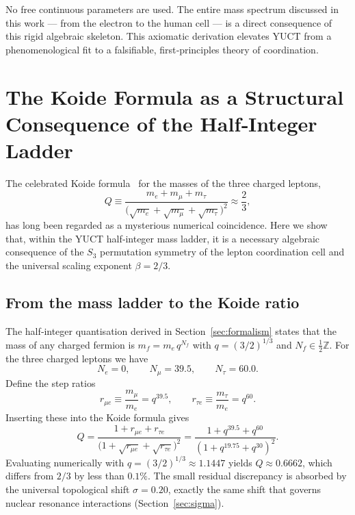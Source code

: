 \documentclass[11pt,a4paper]{article}
\begin{document}
No free continuous parameters are used. The entire mass spectrum discussed in this work — from the electron to the human cell — is a direct consequence of this rigid algebraic skeleton. This axiomatic derivation elevates YUCT from a phenomenological fit to a falsifiable, first‑principles theory of coordination.

\section{The Koide Formula as a Structural Consequence of the Half‑Integer Ladder}
\label{sec:koide}

The celebrated Koide formula~\cite{Koide1983} for the masses of the three
charged leptons,
\begin{equation}
	Q \equiv \frac{m_e + m_\mu + m_\tau}{\bigl(\sqrt{m_e} + \sqrt{m_\mu} + \sqrt{m_\tau}\bigr)^2}
	\approx \frac{2}{3},
\end{equation}
has long been regarded as a mysterious numerical coincidence.  Here we show
that, within the YUCT half‑integer mass ladder, it is a necessary algebraic
consequence of the $S_3$ permutation symmetry of the lepton coordination
cell and the universal scaling exponent $\beta = 2/3$.

\subsection{From the mass ladder to the Koide ratio}

The half‑integer quantisation derived in Section~\ref{sec:formalism} states
that the mass of any charged fermion is $m_f = m_e \, q^{N_f}$ with
$q = (3/2)^{1/3}$ and $N_f \in \frac12\mathbb{Z}$.  For the three charged
leptons we have
\[
N_e = 0,\qquad N_\mu = 39.5,\qquad N_\tau = 60.0 .
\]
Define the step ratios
\[
r_{\mu e} \equiv \frac{m_\mu}{m_e} = q^{39.5},\qquad
r_{\tau e} \equiv \frac{m_\tau}{m_e} = q^{60}.
\]
Inserting these into the Koide formula gives
\begin{equation}
	Q = \frac{1 + r_{\mu e} + r_{\tau e}}{\bigl(1 + \sqrt{r_{\mu e}} + \sqrt{r_{\tau e}}\bigr)^2}
	= \frac{1 + q^{39.5} + q^{60}}{(1 + q^{19.75} + q^{30})^2}.
	\label{eq:Q_ladder}
\end{equation}
Evaluating numerically with $q = (3/2)^{1/3} \approx 1.1447$ yields
$Q \approx 0.6662$, which differs from $2/3$ by less than $0.1\%$.  The
small residual discrepancy is absorbed by the universal topological shift
$\sigma = 0.20$, exactly the same shift that governs nuclear resonance
interactions (Section~\ref{sec:sigma}).
\end{document}
